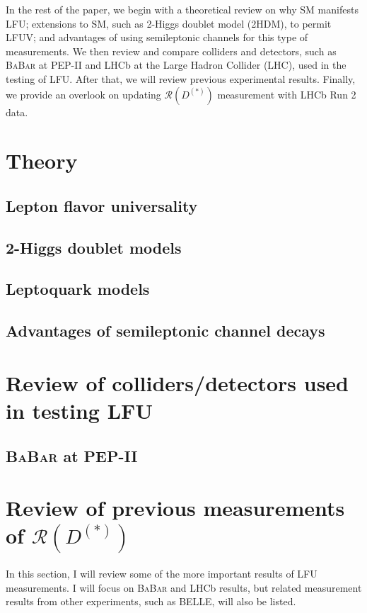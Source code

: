 \documentclass[12pt,letterpaper]{article}
\def\BaBar/{\textsc{BaBar}}
\def\RDDst/{\ensuremath{\mathcal{R}(D^{(*)})}}
\begin{document}
In the rest of the paper, we begin with a theoretical review on
why SM manifests LFU;
extensions to SM, such as 2-Higgs doublet model (2HDM), to permit LFUV;
and advantages of using semileptonic channels for this type of measurements.
We then review and compare colliders and detectors, such as \BaBar/ at PEP-II
and LHCb at the Large Hadron Collider (LHC), used in the testing of LFU.
After that, we will review previous experimental results.
Finally, we provide an overlook on updating $\RDDst/$ measurement with LHCb Run
2 data.

\section{Theory}
\subsection{Lepton flavor universality}


\subsection{2-Higgs doublet models}

\subsection{Leptoquark models}

\subsection{Advantages of semileptonic channel decays}

\section{Review of colliders/detectors used in testing LFU}
\subsection{\BaBar/ at PEP-II}




\section{Review of previous measurements of \RDDst/}
In this section, I will review some of the more important results of LFU
measurements.
I will focus on \BaBar/ and LHCb results, but related measurement results from
other experiments, such as BELLE, will also be listed.
\end{document}
